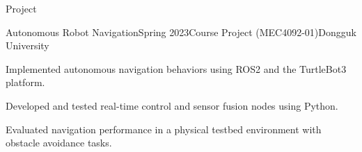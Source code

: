 \begin{rSection}{Project}

\begin{rSubsection}{Autonomous Robot Navigation}{Spring 2023}{Course Project (MEC4092-01)}{Dongguk University}
  \item Implemented autonomous navigation behaviors using ROS2 and the TurtleBot3 platform.
  \item Developed and tested real-time control and sensor fusion nodes using Python.
  \item Evaluated navigation performance in a physical testbed environment with obstacle avoidance tasks.
\end{rSubsection}

\end{rSection}

